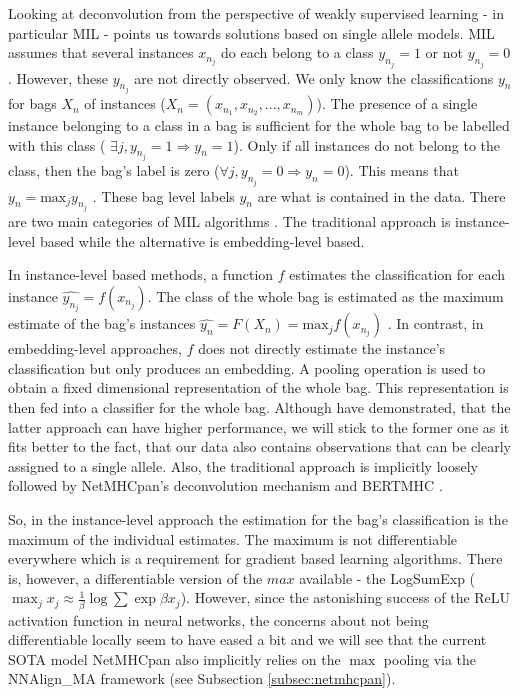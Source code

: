 \documentclass[msc,deptreport,ai]{infthesis} %
\begin{document}
		Looking at deconvolution from the perspective of weakly supervised learning - in particular \gls{MIL} - points us towards solutions based on single allele models. \gls{MIL} assumes that several instances $x_{n_j}$ do each belong to a class $y_{n_j} = 1$ or not $y_{n_j} = 0$. However, these $y_{n_j}$ are not directly observed. We only know the classifications $y_n$ for bags $X_n$ of instances ($X_n = (x_{n_1}, x_{n_2}, ..., x_{n_m})$). The presence of a single instance belonging to a class in a bag is sufficient for the whole bag to be labelled with this class ( $\exists j, y_{n_j} = 1 \Rightarrow y_n = 1$). Only if all instances do not belong to the class, then the bag's label is zero ($\forall j, y_{n_j} = 0 \Rightarrow y_n = 0$). This means that $y_n = \textrm{max}_j y_{n_j}$ \cite{ilse_attention-based_2018}. These bag level labels $y_n$ are what is contained in the data. There are two main categories of \gls{MIL} algorithms \cite{wang_revisiting_2018, ilse_attention-based_2018}. The traditional approach is instance-level based while the alternative is embedding-level based. 
		
		In instance-level based methods, a function $f$ estimates the classification for each instance $\hat{y_{n_j}} = f(x_{n_j})$. The class of the whole bag is estimated as the maximum estimate of the bag's instances $\hat{y_n} = F(X_n)=\textrm{max}_j f(x_{n_j})$ \cite{ramon_multi_2000}. In contrast, in embedding-level approaches, $f$ does not directly estimate the instance's classification but only produces an embedding. A pooling operation is used to obtain a fixed dimensional representation of the whole bag. This representation is then fed into a classifier for the whole bag. Although \cite{wang_revisiting_2018} have demonstrated, that the  latter approach can have higher performance, we will stick to the former one as it fits better to the fact, that our data also contains observations that can be clearly assigned to a single allele. Also, the traditional approach is implicitly loosely followed by NetMHCpan's deconvolution mechanism \cite{alvarez_nnalign_ma_2019} and BERTMHC \cite{cheng_bertmhc_2020}.

		So, in the instance-level approach the estimation for the bag's classification is the maximum of the individual estimates. The maximum is not differentiable everywhere which is a requirement for gradient based learning algorithms. There is, however, a differentiable version of the $max$ available - the LogSumExp ($\max_j x_j \approx \frac{1}{\beta}\log \sum \exp \beta x_j$). However, since the astonishing success of the ReLU activation function in neural networks, the concerns about not being differentiable locally seem to have eased a bit and we will see that the current \gls{SOTA} model NetMHCpan also implicitly relies on the $\max$ pooling via the NNAlign\_MA framework (see Subsection \ref{subsec:netmhcpan}).
\end{document}
